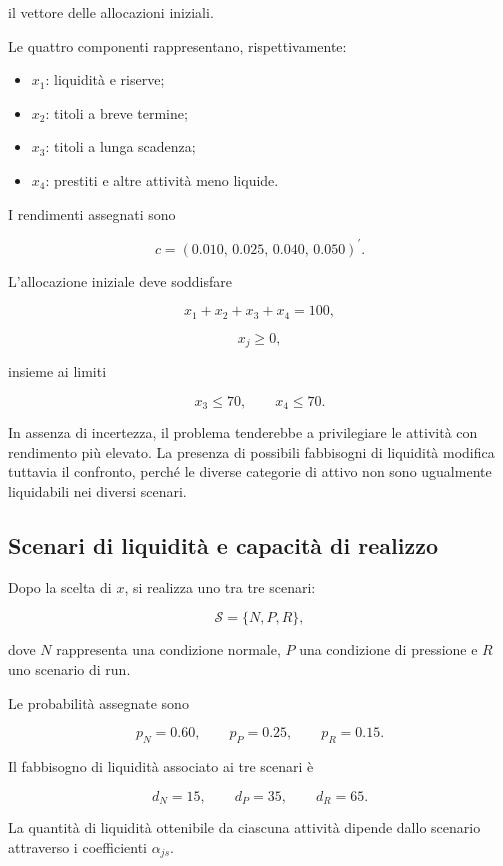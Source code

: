 \noindent il vettore delle allocazioni iniziali.

Le quattro componenti rappresentano, rispettivamente:

\begin{itemize}
\item \(x_1\): liquidit\`a e riserve;

\item \(x_2\): titoli a breve termine;

\item \(x_3\): titoli a lunga scadenza;

\item \(x_4\): prestiti e altre attivit\`a meno liquide.
\end{itemize}

I rendimenti assegnati sono

\[
c=
\left(
0.010,\,
0.025,\,
0.040,\,
0.050
\right)^{\prime}.
\]

L'allocazione iniziale deve soddisfare

\[
x_1+x_2+x_3+x_4=100,
\]

\[
x_j\geq 0,
\]

\noindent insieme ai limiti

\[
x_3\leq 70,
\qquad
x_4\leq 70.
\]

In assenza di incertezza, il problema tenderebbe a privilegiare le attivit\`a
con rendimento pi\`u elevato. La presenza di possibili fabbisogni di
liquidit\`a modifica tuttavia il confronto, perch\'e le diverse categorie di
attivo non sono ugualmente liquidabili nei diversi scenari.

\subsection{Scenari di liquidit\`a e capacit\`a di realizzo}

Dopo la scelta di \(x\), si realizza uno tra tre scenari:

\[
\mathcal{S}
=
\{N,P,R\},
\]

\noindent dove \(N\) rappresenta una condizione normale, \(P\) una condizione
di pressione e \(R\) uno scenario di run.

Le probabilit\`a assegnate sono

\[
p_N=0.60,
\qquad
p_P=0.25,
\qquad
p_R=0.15.
\]

Il fabbisogno di liquidit\`a associato ai tre scenari \`e

\[
d_N=15,
\qquad
d_P=35,
\qquad
d_R=65.
\]

La quantit\`a di liquidit\`a ottenibile da ciascuna attivit\`a dipende dallo
scenario attraverso i coefficienti \(\alpha_{js}\).

